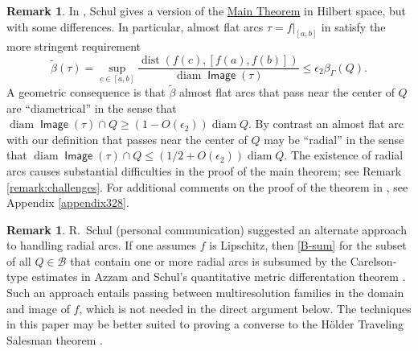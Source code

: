 \documentclass[12pt]{amsart}
\numberwithin{equation}{section}
\theoremstyle{plain}
\theoremstyle{definition}
\newtheorem{remark}[theorem]{Remark}
\newcommand{\diam}{\mathop\mathrm{diam}\nolimits}
\newcommand{\dist}{\mathop\mathrm{dist}\nolimits}
\newcommand{\Image}{\mathop\mathsf{Image}\nolimits}
\numberwithin{figure}{section}
\begin{document}
\begin{remark}\label{r:Schul-1} In \cite{Schul-Hilbert}, Schul gives a version of the \hyperref[t:main]{Main Theorem} in Hilbert space, but with some differences.
In particular, almost flat arcs $\tau=f|_{[a,b]}$ in \cite{Schul-Hilbert} satisfy the more stringent requirement \begin{equation}\label{e:arc-beta}\tilde\beta(\tau) = \sup_{c\in[a,b]}\frac{\dist(f(c),[f(a),f(b)])}{\diam \Image(\tau)}\leq \epsilon_2 \beta_{\Gamma}(Q).\end{equation} A geometric consequence is that $\tilde\beta$ almost flat arcs that pass near the center of $Q$ are ``diametrical'' in the sense that $\diam \Image(\tau)\cap Q\geq (1-O(\epsilon_2))\diam Q$. By contrast an almost flat arc with our definition that passes near the center of $Q$ may be ``radial'' in the sense that $\diam \Image(\tau)\cap Q \leq (1/2+O(\epsilon_2))\diam Q$. The existence of radial arcs causes substantial difficulties in the proof of the main theorem; see Remark \ref{remark:challenges}. For additional comments on the proof of the theorem in \cite{Schul-Hilbert}, see Appendix \ref{appendix328}.\end{remark}

\begin{remark}R.~Schul (personal communication) suggested an alternate approach to handling radial arcs. If one assumes $f$ is Lipschitz, then \eqref{B-sum} for the subset of all $Q\in\mathscr{B}$ that contain one or more radial arcs is subsumed by the Carelson-type estimates in Azzam and Schul's quantitative metric differentation theorem \cite{AS-metric}. Such an approach entails passing between multiresolution families in the domain and image of $f$, which is not needed in the direct argument below. The techniques in this paper may be better suited to proving a converse to the H\"older Traveling Salesman theorem \cite{BNV}.\end{remark}
\end{document}
